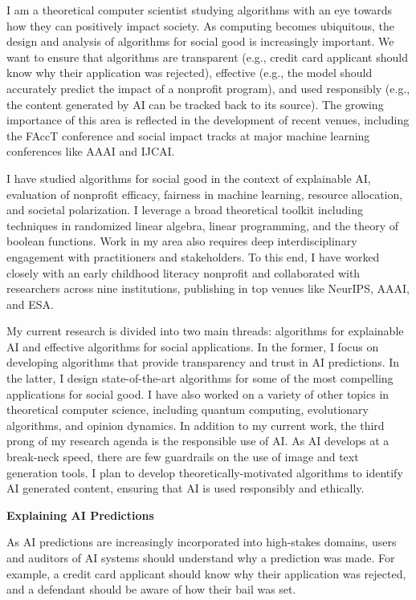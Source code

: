 \documentclass[11pt]{article}
\begin{document}
{\setlength{\parindent}{0cm}

I am a theoretical computer scientist studying algorithms with an eye towards how they can positively impact society. As computing becomes ubiquitous, the design and analysis of algorithms for social good is increasingly important. We want to ensure that algorithms are transparent (e.g., credit card applicant should know why their application was rejected),
effective (e.g., the model should accurately predict the impact of a nonprofit program),
and used responsibly (e.g., the content generated by AI can be tracked back to its source).
The growing importance of this area is reflected in the development of recent venues, including the FAccT conference and social impact tracks at major machine learning conferences like AAAI and IJCAI.

I have studied algorithms for social good in the context of explainable AI, evaluation of nonprofit efficacy, fairness in machine learning, resource allocation, and societal polarization. I leverage a broad theoretical toolkit including techniques in randomized linear algebra, linear programming, and the theory of boolean functions. Work in my area also requires deep interdisciplinary engagement with practitioners and stakeholders. To this end, I have worked closely with an early childhood literacy nonprofit and collaborated with researchers across nine institutions, publishing in top venues like NeurIPS, AAAI, and ESA.

My current research is divided into two main threads: algorithms for explainable AI and effective algorithms for social applications. In the former, I focus on developing algorithms that provide transparency and trust in AI predictions. In the latter, I design state-of-the-art algorithms for some of the most compelling applications for social good. I have also worked on a variety of other topics in theoretical computer science, including quantum computing, evolutionary algorithms, and opinion dynamics.
In addition to my current work, the third prong of my research agenda is the responsible use of AI.
As AI develops at a break-neck speed, there are few guardrails on the use of image and text generation tools.
I plan to develop theoretically-motivated algorithms to identify AI generated content, ensuring that AI is used responsibly and ethically.

{\large \textbf{Explaining AI Predictions}}

As AI predictions are increasingly incorporated into high-stakes domains, users and auditors of AI systems should understand why a prediction was made. For example, a credit card applicant should know why their application was rejected, and a defendant should be aware of how their bail was set. 

}
\end{document}
